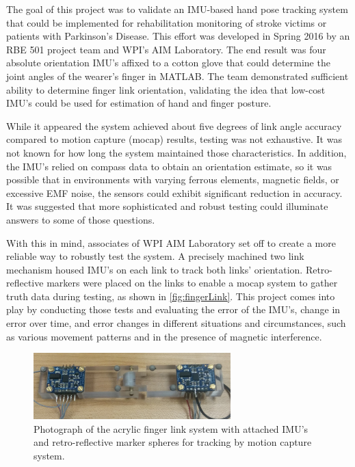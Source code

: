 \documentclass[letterpaper, 10 pt, conference]{ieeeconf}  %
\begin{document}
The goal of this project was to validate an IMU-based hand pose tracking system that could be implemented for rehabilitation monitoring of stroke victims or patients with Parkinson’s Disease. This effort was developed in Spring 2016 by an RBE 501 project team and WPI's AIM Laboratory. The end result was four absolute orientation IMU's affixed to a cotton glove that could determine the joint angles of the wearer's finger in MATLAB. The team demonstrated sufficient ability to determine finger link orientation, validating the idea that low-cost IMU's could be used for estimation of hand and finger posture.

While it appeared the system achieved about five degrees of link angle accuracy compared to motion capture (mocap) results, testing was not exhaustive. It was not known for how long the system maintained those characteristics. In addition, the IMU's relied on compass data to obtain an orientation estimate, so it was possible that in environments with varying ferrous elements, magnetic fields, or excessive EMF noise, the sensors could exhibit significant reduction in accuracy. It was suggested that more sophisticated and robust testing could illuminate answers to some of those questions.

With this in mind, associates of WPI AIM Laboratory set off to create a more reliable way to robustly test the system. A precisely machined two link mechanism housed IMU’s on each link to track both links' orientation. Retro-reflective markers were placed on the links to enable a mocap system to gather truth data during testing, as shown in \autoref{fig:fingerLink}. This project comes into play by conducting those tests and evaluating the error of the IMU's, change in error over time, and error changes in different situations and circumstances, such as various movement patterns and in the presence of magnetic interference.

\begin{figure}[thpb]
	\centering
	\includegraphics[width = 3in]{finger_link.jpg}
    \caption{Photograph of the acrylic finger link system with attached IMU's and retro-reflective marker spheres for tracking by motion capture system. }
    \label{fig:fingerLink}
\end{figure}
\end{document}
